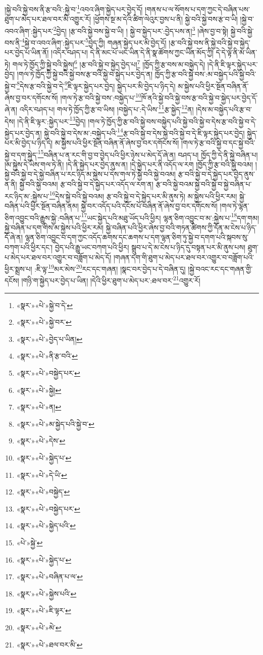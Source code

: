 །སྐྱེ་བའི་སྐྱེ་བས་ནི་རྩ་བའི་:སྐྱེ་བ་\footnote{«སྣར་»«པེ་»སྐྱེ་བ་དེ་}འབའ་ཞིག་སྐྱེད་པར་བྱེད་དོ། །གནས་པ་ལ་སོགས་པ་དག་ཀྱང་དེ་བཞིན་པས་ཐུག་པ་མེད་པར་ཐལ་བར་མི་འགྱུར་རོ། །ཕྱོགས་སྔ་མ་དེའི་ཚིག་ལེའུར་བྱས་པ་ནི། སྐྱེ་བའི་སྐྱེ་བས་རྩ་བ་ཡི། །སྐྱེ་བ་འབའ་ཞིག་:སྐྱེད་པར་\footnote{«སྣར་»«པེ་»སྐྱེ་བར་}བྱེད། །རྩ་བའི་སྐྱེ་བས་སྐྱེ་བ་ཡི། །
སྐྱེ་བ་སྐྱེད་པར་:བྱེད་པས་ན།\footnote{«སྣར་»«པེ་»བྱེད་པ་ཡིན།} །ཞེས་བྱ་བ་སྟེ། སྐྱེ་བའི་སྐྱེ་བས་ནི་\footnote{«སྣར་»«པེ་»ནི་རྩ་བའི་}སྐྱེ་བ་འབའ་ཞིག་:སྐྱེད་པར་\footnote{«སྣར་»«པེ་»བསྐྱེད་པར་}བྱེད་ཀྱི། གཞན་སྐྱེད་པར་མི་བྱེད་དོ། །རྩ་བའི་སྐྱེ་བས་ནི་སྐྱེ་བའི་སྐྱེ་བ་སྐྱེད་པར་བྱེད་པ་ཡིན་ནོ། །འདིར་བཤད་པ། དེ་ནི་མང་པོ་ཡང་ཡིན་དེ་ནི་སྣ་ཚོགས་ཀྱང་ཡིན་མོད་ཀྱི། དེ་དེ་ལྟ་ནི་མ་ཡིན་ཏེ། གལ་ཏེ་ཁྱོད་ཀྱི་སྐྱེ་བའི་སྐྱེས།\footnote{«སྣར་»«པེ་»སྐྱེ།} །རྩ་བའི་སྐྱེ་བ་སྐྱེད་བྱེད་པ།\footnote{«སྣར་»«པེ་»ན།} །ཁྱོད་ཀྱི་རྩ་བས་མ་བསྐྱེད་དེ། །དེ་ནི་ཇི་ལྟར་སྐྱེད་པར་བྱེད། །གལ་ཏེ་ཁྱོད་ཀྱི་སྐྱེ་བའི་སྐྱེ་བས་རྩ་བའི་སྐྱེ་བ་སྐྱེད་པར་བྱེད་ན། ཁྱོད་ཀྱི་རྩ་བའི་སྐྱེ་བས་:མ་བསྐྱེད་པའི་སྐྱེ་བའི་སྐྱེ་བ་\footnote{«སྣར་»«པེ་»མ་སྐྱེད་པའི་སྐྱེ་བ་}དེས་རྩ་བའི་སྐྱེ་བ་དེ་\footnote{«སྣར་»«པེ་»དེས་}ཇི་ལྟར་སྐྱེད་པར་བྱེད། སྐྱེད་པར་མི་བྱེད་པ་ཉིད་དེ། མ་སྐྱེས་པའི་ཕྱིར་སྔོན་བཞིན་ནོ་ཞེས་བྱ་བར་དགོངས་སོ། །གལ་ཏེ་རྩ་བའི་སྐྱེ་བས་:བསྐྱེད་པ་\footnote{«སྣར་»«པེ་»སྐྱེད་པ་}ཁོ་ནའི་སྐྱེ་བའི་སྐྱེ་བས་རྩ་བའི་སྐྱེ་བ་སྐྱེད་པར་བྱེད་དོ་ཞེ་ན། འདིར་བཤད་པ། གལ་ཏེ་ཁྱོད་ཀྱི་རྩ་བ་ཡིས། །བསྐྱེད་པ་:དེ་ཡིས་\footnote{«སྣར་»«པེ་»དེ་ཡི་}རྩ་སྐྱེད་\footnote{«སྣར་»«པེ་»བསྐྱེད་}ན། །དེས་མ་བསྐྱེད་པའི་རྩ་བ་དེས། །དེ་ནི་ཇི་ལྟར་:སྐྱེད་པར་\footnote{«སྣར་»«པེ་»བསྐྱེད་པར་}བྱེད། །གལ་ཏེ་ཁྱོད་ཀྱི་རྩ་བའི་སྐྱེ་བས་བསྐྱེད་པའི་སྐྱེ་བའི་སྐྱེ་བ་དེས་རྩ་བའི་སྐྱེ་བ་དེ་སྐྱེད་པར་བྱེད་ན། སྐྱེ་བའི་སྐྱེ་བ་དེས་མ་:བསྐྱེད་པའི་\footnote{«སྣར་»«པེ་»སྐྱེད་པའི་}རྩ་བའི་སྐྱེ་བ་དེས་སྐྱེ་བའི་སྐྱེ་བ་དེ་ཇི་ལྟར་སྐྱེད་པར་བྱེད། སྐྱེད་པར་མི་བྱེད་པ་ཉིད་དེ། མ་སྐྱེས་པའི་ཕྱིར་སྔོན་བཞིན་ནོ་ཞེས་བྱ་བར་དགོངས་སོ། །གལ་ཏེ་རྩ་བའི་སྐྱེ་བ་དང་སྐྱེ་བའི་སྐྱེ་བ་དག་སྐྱེད་\footnote{«པེ་»སྐྱེ་}བཞིན་པ་ན་རང་གི་བྱ་བ་བྱེད་པའི་ཕྱིར་ཉེས་པ་མེད་དོ་ཞེ་ན། བཤད་པ། ཁྱོད་ཀྱི་དེ་ནི་སྐྱེ་བཞིན་པ། །མ་སྐྱེས་དེ་ཡིས་གལ་ཏེ་ནི། །དེ་ནི་སྐྱེད་པར་བྱེད་ནུས་ན། །དེ་སྐྱེད་པར་ནི་འདོད་ལ་རག །ཁྱོད་ཀྱི་རྩ་བའི་སྐྱེ་བའམ། །སྐྱེ་བའི་སྐྱེ་བ་དེ་སྐྱེ་བཞིན་པ་རང་ཉིད་མ་སྐྱེས་པ་དེས་གལ་ཏེ་སྐྱེ་བའི་སྐྱེ་བའམ། རྩ་བའི་སྐྱེ་བ་དེ་སྐྱེད་པར་བྱེད་ནུས་ན་ནི། སྐྱེ་བའི་སྐྱེ་བའམ། རྩ་བའི་སྐྱེ་བ་དེ་སྐྱེད་པར་འདོད་ལ་རག་ན། རྩ་བའི་སྐྱེ་བའམ་སྐྱེ་བའི་སྐྱེ་བ་སྐྱེ་བཞིན་པ་རང་ཉིད་མ་:སྐྱེས་པ་\footnote{«སྣར་»«པེ་»སྐྱེད་པ་}དེས་སྐྱེ་བའི་སྐྱེ་བའམ། རྩ་བའི་སྐྱེ་བ་དེ་སྐྱེད་པར་མི་ནུས་ཏེ། མ་སྐྱེས་པའི་ཕྱིར་རམ། སྐྱེ་བཞིན་པའི་ཕྱིར་སྔོན་བཞིན་ནམ། སྐྱེ་བར་འདོད་པའི་དངོས་པོ་བཞིན་ནོ་ཞེས་བྱ་བར་དགོངས་སོ། །གལ་ཏེ་ལྷན་ཅིག་འབྱུང་བའི་རྒྱུས་སྐྱེ་:བཞིན་པ་\footnote{«སྣར་»«པེ་»བཞིན་པ་ལ་}ཡང་སྐྱེད་པའི་མཐུ་ཡོད་པའི་ཕྱིར། ལྷན་ཅིག་འབྱུང་བ་མ་:སྐྱེས་པ་\footnote{«སྣར་»«པེ་»སྐྱེས་པའི་}དག་གམ། སྐྱེ་བཞིན་པ་དག་གིས་མ་སྐྱེས་པའི་ཕྱིར་རམ། སྐྱེ་བཞིན་པའི་ཕྱིར་ཞེས་བྱ་བའི་གཏན་ཚིགས་ཀྱི་དོན་མ་ངེས་པ་ཉིད་དོ་ཞེ་ན། ལྷན་ཅིག་འབྱུང་བ་དག་ཀྱང་འདོད་ཆགས་དང་ཆགས་པ་དག་ལྷན་ཅིག་ཏུ་སྐྱེ་བ་དགག་པའི་སྐབས་སུ་བཀག་པའི་ཕྱིར་དང་། བྱེད་པའི་རྒྱུ་ཡང་བཀག་པའི་ཕྱིར། སྒྲུབ་པ་དེ་མ་ངེས་པ་ཉིད་དུ་བསྟན་པར་མི་ནུས་པས། ཐུག་པ་མེད་པར་ཐལ་བར་འགྱུར་བ་བཟློག་པ་མེད་དོ། །གཞན་དག་གི་ཐུག་པ་མེད་པར་ཐལ་བར་འགྱུར་བ་བཟློག་པའི་ཕྱིར་སྨྲས་པ། :ཇི་ལྟ་\footnote{«སྣར་»«པེ་»ཇི་ལྟར་}མར་མེས་\footnote{«སྣར་»«པེ་»མེ་}རང་དང་གཞན། །སྣང་བར་བྱེད་པ་དེ་བཞིན་དུ། །སྐྱེ་བའང་རང་དང་གཞན་གྱི་དངོས། །གཉི་ག་སྐྱེད་པར་བྱེད་པ་ཡིན། །དེའི་ཕྱིར་ཐུག་པ་མེད་པར་:ཐལ་བར་\footnote{«སྣར་»«པེ་»ཐལ་བར་མི་}འགྱུར་རོ། 
